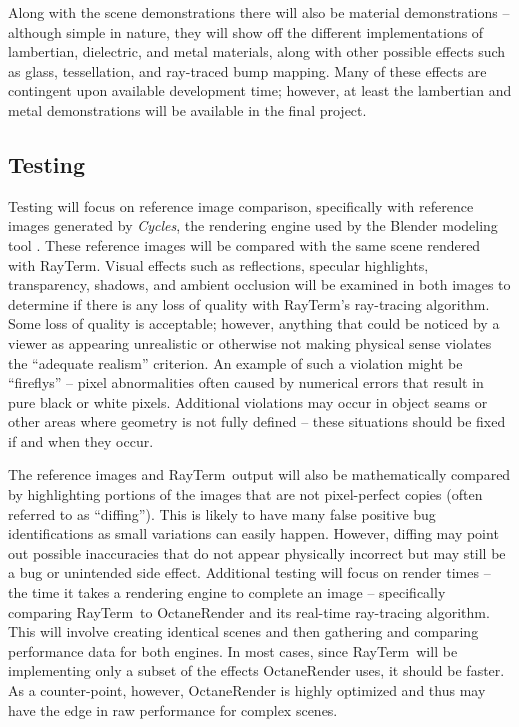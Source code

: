 \documentclass[11pt]{article}
\newcommand{\name}{{\sc RayTerm}}
\begin{document}
Along with the scene demonstrations there will also be material demonstrations -- although simple in nature, they will show off the different implementations of lambertian, dielectric, and metal materials, along with other possible effects such as glass, tessellation, and ray-traced bump mapping.
Many of these effects are contingent upon available development time; however, at least the lambertian and metal demonstrations will be available in the final project.


\subsection{Testing}
\label{sec:evaluate:testing}

Testing will focus on reference image comparison, specifically with reference images generated by {\it Cycles}, the rendering engine used by the Blender modeling tool \cite{blender}.
These reference images will be compared with the same scene rendered with \name.
Visual effects such as reflections, specular highlights, transparency, shadows, and ambient occlusion will be examined in both images to determine if there is any loss of quality with \name's ray-tracing algorithm.
Some loss of quality is acceptable; however, anything that could be noticed by a viewer as appearing unrealistic or otherwise not making physical sense violates the ``adequate realism'' criterion.
An example of such a violation might be ``fireflys'' -- pixel abnormalities often caused by numerical errors that result in pure black or white pixels.
Additional violations may occur in object seams or other areas where geometry is not fully defined -- these situations should be fixed if and when they occur.

The reference images and \name\ output will also be mathematically compared by highlighting portions of the images that are not pixel-perfect copies (often referred to as ``diffing'').
This is likely to have many false positive bug identifications as small variations can easily happen.
However, diffing may point out possible inaccuracies that do not appear physically incorrect but may still be a bug or unintended side effect.
Additional testing will focus on render times -- the time it takes a rendering engine to complete an image -- specifically comparing \name\ to OctaneRender \cite{octane} and its real-time ray-tracing algorithm.
This will involve creating identical scenes and then gathering and comparing performance data for both engines.
In most cases, since \name\ will be implementing only a subset of the effects OctaneRender uses, it should be faster.
As a counter-point, however, OctaneRender is highly optimized and thus may have the edge in raw performance for complex scenes.
\end{document}
